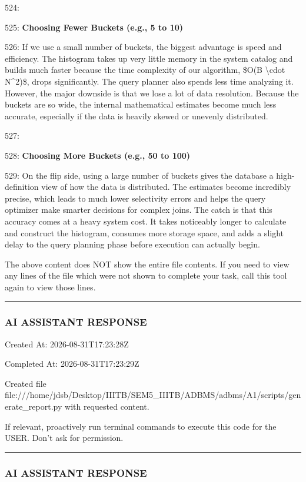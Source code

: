 \documentclass[11pt,a4paper]{article}
\begin{document}
524:

525: \textbf{Choosing Fewer Buckets (e.g., 5 to 10)}

526: If we use a small number of buckets, the biggest advantage is speed and efficiency. The histogram takes up very little memory in the system catalog and builds much faster because the time complexity of our algorithm, \$O(B \textbackslash{}cdot N\textasciicircum{}2)\$, drops significantly. The query planner also spends less time analyzing it. However, the major downside is that we lose a lot of data resolution. Because the buckets are so wide, the internal mathematical estimates become much less accurate, especially if the data is heavily skewed or unevenly distributed.

527:

528: \textbf{Choosing More Buckets (e.g., 50 to 100)}

529: On the flip side, using a large number of buckets gives the database a high-definition view of how the data is distributed. The estimates become incredibly precise, which leads to much lower selectivity errors and helps the query optimizer make smarter decisions for complex joins. The catch is that this accuracy comes at a heavy system cost. It takes noticeably longer to calculate and construct the histogram, consumes more storage space, and adds a slight delay to the query planning phase before execution can actually begin.

The above content does NOT show the entire file contents. If you need to view any lines of the file which were not shown to complete your task, call this tool again to view those lines.


\hrule

\subsubsection{AI ASSISTANT RESPONSE}

Created At: 2026-08-31T17:23:28Z

Completed At: 2026-08-31T17:23:29Z

Created file file:///home/jdsb/Desktop/IIITB/SEM5\_IIITB/ADBMS/adbms/A1/scripts/generate\_report.py with requested content.

If relevant, proactively run terminal commands to execute this code for the USER. Don't ask for permission.


\hrule

\subsubsection{AI ASSISTANT RESPONSE}
\end{document}
